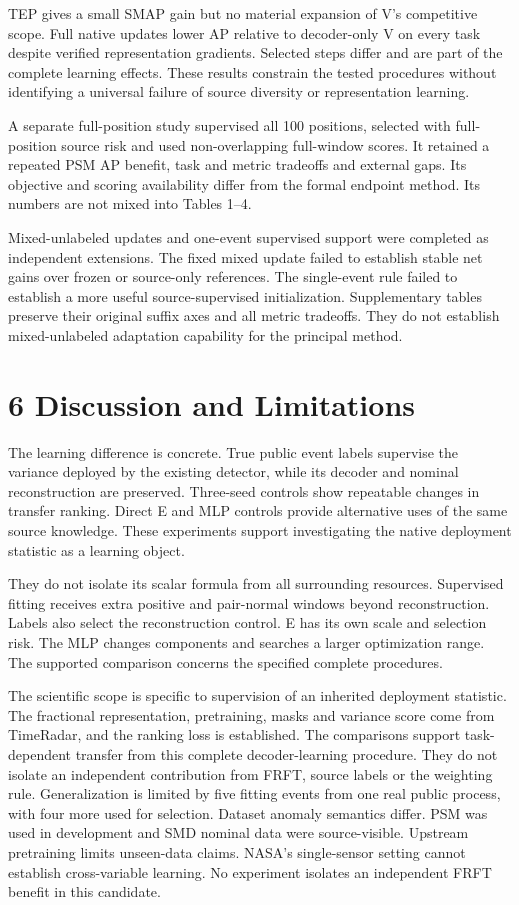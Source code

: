\documentclass[
  english,
  10pt,
]{article}
\begin{document}
TEP gives a small SMAP gain but no material expansion of V's competitive
scope. Full native updates lower AP relative to decoder-only V on every
task despite verified representation gradients. Selected steps differ
and are part of the complete learning effects. These results constrain
the tested procedures without identifying a universal failure of source
diversity or representation learning.

A separate full-position study supervised all 100 positions, selected
with full-position source risk and used non-overlapping full-window
scores. It retained a repeated PSM AP benefit, task and metric tradeoffs
and external gaps. Its objective and scoring availability differ from
the formal endpoint method. Its numbers are not mixed into Tables 1--4.

Mixed-unlabeled updates and one-event supervised support were completed
as independent extensions. The fixed mixed update failed to establish
stable net gains over frozen or source-only references. The single-event
rule failed to establish a more useful source-supervised initialization.
Supplementary tables preserve their original suffix axes and all metric
tradeoffs. They do not establish mixed-unlabeled adaptation capability
for the principal method.

\section{6 Discussion and Limitations}\label{discussion-and-limitations}

The learning difference is concrete. True public event labels supervise
the variance deployed by the existing detector, while its decoder and
nominal reconstruction are preserved. Three-seed controls show
repeatable changes in transfer ranking. Direct E and MLP controls
provide alternative uses of the same source knowledge. These experiments
support investigating the native deployment statistic as a learning
object.

They do not isolate its scalar formula from all surrounding resources.
Supervised fitting receives extra positive and pair-normal windows
beyond reconstruction. Labels also select the reconstruction control. E
has its own scale and selection risk. The MLP changes components and
searches a larger optimization range. The supported comparison concerns
the specified complete procedures.

The scientific scope is specific to supervision of an inherited
deployment statistic. The fractional representation, pretraining, masks
and variance score come from TimeRadar, and the ranking loss is
established. The comparisons support task-dependent transfer from this
complete decoder-learning procedure. They do not isolate an independent
contribution from FRFT, source labels or the weighting rule.
Generalization is limited by five fitting events from one real public
process, with four more used for selection. Dataset anomaly semantics
differ. PSM was used in development and SMD nominal data were
source-visible. Upstream pretraining limits unseen-data claims. NASA's
single-sensor setting cannot establish cross-variable learning. No
experiment isolates an independent FRFT benefit in this candidate.
\end{document}
